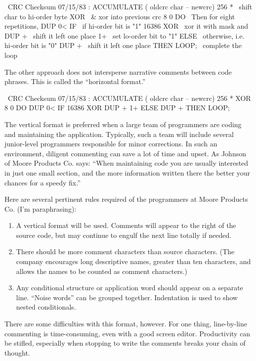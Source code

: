 \begin{Code}
\ CRC Checksum                             07/15/83
: ACCUMULATE    ( oldcrc char -- newcrc)
    256 *              \ shift char to hi-order byte
    XOR                \ & xor into previous crc
    8 0 DO             \ Then for eight repetitions,
       DUP 0< IF       \ if hi-order bit is "1"
          16386 XOR    \ xor it with mask and
          DUP +        \ shift it left one place
          1+           \ set lo-order bit to "1"
             ELSE      \ otherwise, i.e. hi-order bit is "0"
          DUP +        \ shift it left one place
             THEN
       LOOP;           \ complete the loop
\end{Code}
The other approach does not intersperse narrative comments between
code phrases.  This is called the ``horizontal format.''
\begin{Code}
\ CRC Checksum                             07/15/83
: ACCUMULATE    ( oldcrc char -- newcrc)
    256 *  XOR  8 0 DO  DUP 0< IF
       16386 XOR  DUP +  1+  ELSE  DUP +  THEN  LOOP;
\end{Code}

The vertical format is preferred when a large team of programmers are
coding and maintaining the application.  Typically, such a team will include
several junior-level programmers responsible for minor corrections.
In such an environment, diligent commenting can save a lot of time and
upset.  As Johnson of Moore Products Co. says: ``When maintaining code
you are usually interested in just one small section, and the more information
written there the better your chances for a speedy fix.''

Here are several pertinent rules required of the \Forth{} programmers
at Moore Products Co. (I'm paraphrasing):
\begin{enumerate}
\item A vertical format will be used.  Comments will appear to the right of the
source code, but may continue to engulf the next line totally if needed.
\item There should be more comment characters than source characters.  (The
company encourages long descriptive names, greater than ten characters,
and allows the names to be counted as comment characters.)
\item Any conditional structure or application word should appear on a separate
line.  ``Noise words'' can be grouped together.  Indentation is used to show
nested conditionals.
\end{enumerate}
There are some difficulties with this format, however.  For one thing, line-by-line
commenting is time-consuming, even with a good screen editor.
Productivity can be stifled, especially when stopping to write the comments
breaks your chain of thought.


